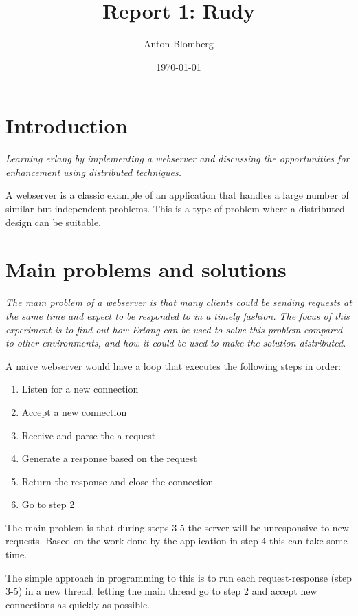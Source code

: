 \documentclass[a4paper, 11pt]{article}
\title{Report 1: Rudy}
\author{Anton Blomberg}
\date{\today{}}
\begin{document}
\maketitle

\section{Introduction}

\textit{Learning erlang by implementing a webserver and discussing the opportunities
for enhancement using distributed techniques.}

A webserver is a classic example of an application that handles a large number of similar but independent problems.
This is a type of problem where a distributed design can be suitable.

\section{Main problems and solutions}

\textit{The main problem of a webserver is that many clients could be sending requests at the same time
and expect to be responded to in a timely fashion. The focus of this experiment is to find out how
Erlang can be used to solve this problem compared to other environments, and how it could be used to make
the solution distributed.}

A naive webserver would have a loop that executes the following steps in order:
\begin{enumerate}
  \item Listen for a new connection
  \item Accept a new connection
  \item Receive and parse the a request
  \item Generate a response based on the request
  \item Return the response and close the connection
  \item Go to step 2
\end{enumerate}

The main problem is that during steps 3-5 the server will be unresponsive to new requests.
 Based on the work done by the application in step 4 this can take some time.

The simple approach in programming to this is to run each request-response (step 3-5) in
a new thread, letting the main thread go to step 2 and accept new connections as quickly as possible.
\end{document}
